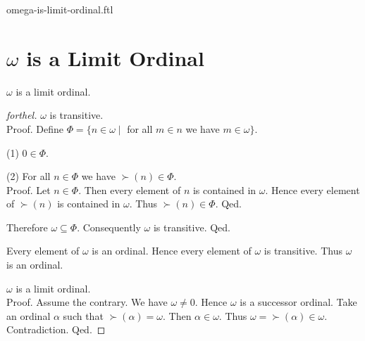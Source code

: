 \documentclass{naproche-library}
\begin{document}
\begin{smodule}{omega-is-limit-ordinal.ftl}

  \section*{$\omega$ is a Limit Ordinal}

  \begin{proposition}[forthel,id=SET_THEORY_03_764451995254784,printid]
    $\omega$ is a limit ordinal.
  \end{proposition}
  \begin{proof}[forthel]
    $\omega$ is transitive. \\
    Proof.
      Define $\Phi = \{ n \in \omega \mid$ for all $m \in n$ we have $m \in \omega \}$.

      (1) $0 \in \Phi$.

      (2) For all $n \in \Phi$ we have $\succ(n) \in \Phi$. \\
      Proof.
        Let $n \in \Phi$.
        Then every element of $n$ is contained in $\omega$.
        Hence every element of $\succ(n)$ is contained in $\omega$.
        Thus $\succ(n) \in \Phi$.
      Qed.

      Therefore $\omega \subseteq \Phi$.
      Consequently $\omega$ is transitive.
    Qed.

    Every element of $\omega$ is an ordinal.
    Hence every element of $\omega$ is transitive.
    Thus $\omega$ is an ordinal.

    $\omega$ is a limit ordinal. \\
    Proof.
      Assume the contrary.
      We have $\omega \neq 0$.
      Hence $\omega$ is a successor ordinal.
      Take an ordinal $\alpha$ such that $\succ(\alpha) = \omega$.
      Then $\alpha \in \omega$.
      Thus $\omega = \succ(\alpha) \in \omega$.
      Contradiction.
    Qed.
  \end{proof}
\end{smodule}
\end{document}
